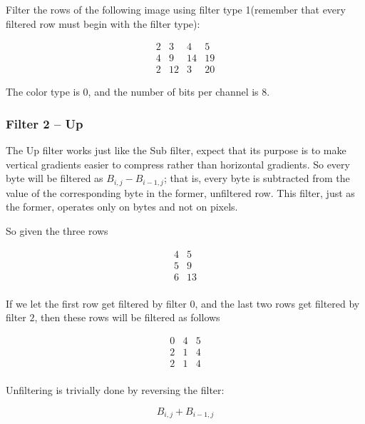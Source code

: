 \begin{Exercise}[label={filter-1}]

  Filter the rows of the following image using filter type 1(remember
  that every filtered row must begin with the filter type):

  \[
  \begin{matrix}
    2 & 3 & 4 & 5 \\
    4 & 9 & 14 & 19 \\
    2 & 12 & 3 & 20
  \end{matrix}
  \]

  The color type is $0$, and the number of bits per channel is $8$.

\end{Exercise}

\subsubsection{Filter 2 -- Up}

The Up filter works just like the Sub filter, expect that its purpose
is to make vertical gradients easier to compress rather than
horizontal gradients. So every byte will be filtered as $B_{i,j} -
B_{i-1,j}$; that is, every byte is subtracted from the value of the
corresponding byte in the former, unfiltered row. This filter, just as
the former, operates only on bytes and not on pixels.

So given the three rows

\[
\begin{matrix}
  4 & 5 \\
  5 & 9 \\
  6 & 13 \\
\end{matrix}
\]

If we let the first row get filtered by filter $0$, and the last two
rows get filtered by filter $2$, then these rows will be filtered as
follows

\[
\begin{matrix}
  0 & 4 & 5 \\
  2 & 1 & 4 \\
  2 & 1 & 4 \\
\end{matrix}
\]

Unfiltering is trivially done by reversing the filter:

\begin{equation*}
  B_{i,j} + B_{i-1,j}
\end{equation*}

